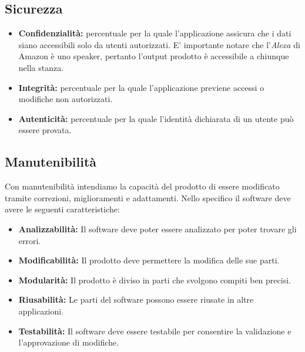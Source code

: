 \subsection{Sicurezza}
\begin{itemize}
	\item \textbf{Confidenzialità:} percentuale per la quale l'applicazione assicura che i dati siano accessibili solo da utenti autorizzati. E' importante notare che l'\textit{Alexa} di Amazon è uno speaker, pertanto l'output prodotto è accessibile a chiunque nella stanza.
	\item \textbf{Integrità:} percentuale per la quale l'applicazione previene accessi o modifiche non autorizzati.
	\item \textbf{Autenticità:} percentuale per la quale l'identità dichiarata di un utente può essere provata.
\end{itemize}
\subsection{Manutenibilità}
Con manutenibilità intendiamo la capacità del prodotto di essere modificato tramite correzioni, miglioramenti e adattamenti.
Nello specifico il software deve avere le seguenti caratteristiche:
\begin{itemize}
	\item \textbf{Analizzabilità:} Il software deve poter essere analizzato per poter trovare gli errori.
	\item \textbf{Modificabilità:} Il prodotto deve permettere la modifica delle sue parti.
	\item \textbf{Modularità:} Il prodotto è diviso in parti che svolgono compiti ben precisi.
	\item \textbf{Riusabilità:} Le parti del software possono essere riusate in altre applicazioni.
	\item \textbf{Testabilità:} Il software deve essere testabile per consentire la validazione e l'approvazione di modifiche.
\end{itemize}	
	